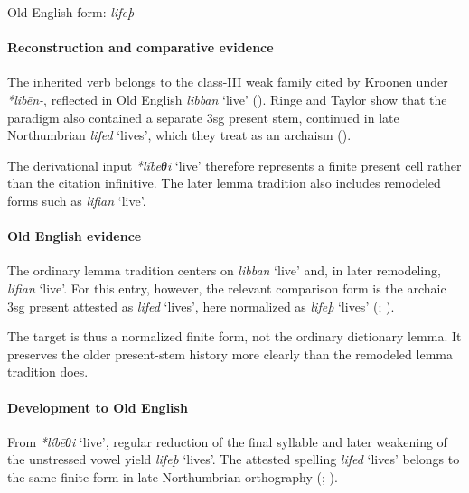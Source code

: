 \documentclass[
  british,
  a4paper,
]{article}
\providecommand{\Recon}[1]{\emph{*#1}}
\begin{document}
Old English form: \emph{lifeþ}

\paragraph{Reconstruction and comparative
evidence}\label{reconstruction-and-comparative-evidence-135}

The inherited verb belongs to the class-III weak family cited by Kroonen
under \emph{*libēn-}, reflected in Old English {\emph{libban}} `live'
(). Ringe and Taylor show
that the paradigm also contained a separate 3sg present stem, continued
in late Northumbrian {\emph{lifed}} `lives', which they treat as an
archaism ().

The derivational input \Recon{líbēθi} `live' therefore represents a
finite present cell rather than the citation infinitive. The later lemma
tradition also includes remodeled forms such as {\emph{lifian}} `live'.

\paragraph{Old English evidence}\label{old-english-evidence-137}

The ordinary lemma tradition centers on {\emph{libban}} `live' and, in
later remodeling, {\emph{lifian}} `live'. For this entry, however, the
relevant comparison form is the archaic 3sg present attested as
{\emph{lifed}} `lives', here normalized as {\emph{lifeþ}} `lives'
(;
).

The target is thus a normalized finite form, not the ordinary dictionary
lemma. It preserves the older present-stem history more clearly than the
remodeled lemma tradition does.

\paragraph{Development to Old
English}\label{development-to-old-english-135}

From \Recon{líbēθi} `live', regular reduction of the final syllable and
later weakening of the unstressed vowel yield {\emph{lifeþ}} `lives'.
The attested spelling {\emph{lifed}} `lives' belongs to the same finite
form in late Northumbrian orthography
(;
).
\end{document}
